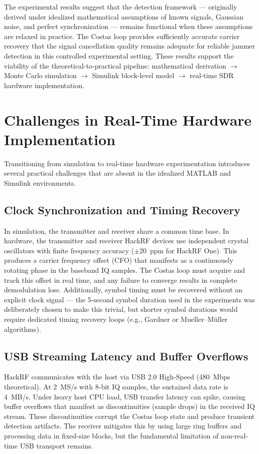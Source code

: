 \documentclass{article}
\begin{document}
The experimental results suggest that the detection framework — originally derived under idealized mathematical assumptions of known signals, Gaussian noise, and perfect synchronization — remains functional when these assumptions are relaxed in practice. The Costas loop provides sufficiently accurate carrier recovery that the signal cancellation quality remains adequate for reliable jammer detection in this controlled experimental setting. These results support the viability of the theoretical-to-practical pipeline: mathematical derivation $\rightarrow$ Monte Carlo simulation $\rightarrow$ Simulink block-level model $\rightarrow$ real-time SDR hardware implementation.


\newpage
\section{Challenges in Real-Time Hardware Implementation}

Transitioning from simulation to real-time hardware experimentation introduces several practical challenges that are absent in the idealized MATLAB and Simulink environments.

\subsection{Clock Synchronization and Timing Recovery}

In simulation, the transmitter and receiver share a common time base. In hardware, the transmitter and receiver HackRF devices use independent crystal oscillators with finite frequency accuracy ($\pm$20~ppm for HackRF One). This produces a carrier frequency offset (CFO) that manifests as a continuously rotating phase in the baseband IQ samples. The Costas loop must acquire and track this offset in real time, and any failure to converge results in complete demodulation loss. Additionally, symbol timing must be recovered without an explicit clock signal — the 5-second symbol duration used in the experiments was deliberately chosen to make this trivial, but shorter symbol durations would require dedicated timing recovery loops (e.g., Gardner or Mueller--M\"uller algorithms).

\subsection{USB Streaming Latency and Buffer Overflows}

HackRF communicates with the host via USB 2.0 High-Speed (480~Mbps theoretical). At 2~MS/s with 8-bit IQ samples, the sustained data rate is 4~MB/s. Under heavy host CPU load, USB transfer latency can spike, causing buffer overflows that manifest as discontinuities (sample drops) in the received IQ stream. These discontinuities corrupt the Costas loop state and produce transient detection artifacts. The receiver mitigates this by using large ring buffers and processing data in fixed-size blocks, but the fundamental limitation of non-real-time USB transport remains.
\end{document}
